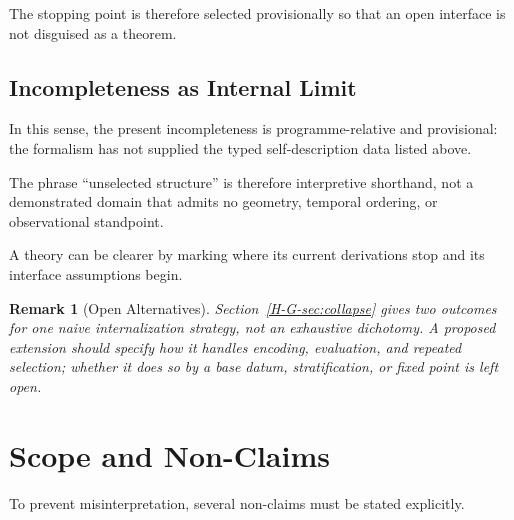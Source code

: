 \documentclass[12pt,a4paper,openany]{book}
\newtheorem{remark}[theorem]{Remark}
\begin{document}
The stopping point is therefore selected provisionally so that an open interface is not disguised as a theorem.

\subsection{Incompleteness as Internal Limit}

In this sense, the present incompleteness is programme-relative and provisional: the formalism has not supplied the typed self-description data listed above.

The phrase ``unselected structure'' is therefore interpretive shorthand, not a demonstrated domain that admits no geometry, temporal ordering, or observational standpoint.

A theory can be clearer by marking where its current derivations stop and its interface assumptions begin.

\begin{remark}[Open Alternatives]
Section~\ref{H-G-sec:collapse} gives two outcomes for one naive internalization strategy, not an exhaustive dichotomy.  A proposed extension should specify how it handles encoding, evaluation, and repeated selection; whether it does so by a base datum, stratification, or fixed point is left open.
\end{remark}

\section{Scope and Non-Claims}
\label{H-G-sec:nonclaims}

To prevent misinterpretation, several non-claims must be stated explicitly.
\end{document}
